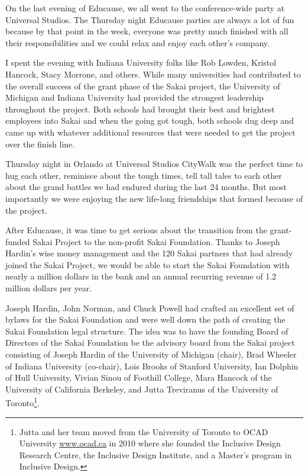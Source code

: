 \documentclass[12pt]{book}
\begin{document}
On the last evening of Educause, we all went to the
conference-wide party at Universal Studios.  The
Thursday night Educause parties are always a lot of fun because
by that point in the week, everyone was
pretty much finished with all their responsibilities
and we could relax and enjoy each other's company.

I spent the evening with
Indiana University
folks like Rob Lowden, Kristol Hancock, Stacy Morrone,
and others.   While many universities had contributed
to the overall success of the grant phase of the Sakai
project, the University of Michigan and Indiana University
had provided the strongest leadership throughout the project.
Both schools had brought their best and brightest employees
into Sakai and when the going got tough, both schools
dug deep and came up with whatever additional resources
that were needed to get the project over the finish line.

Thursday night in Orlando at Universal
Studios CityWalk was the perfect time to
hug each other, reminisce about the tough times,
tell tall tales to each other about the
grand battles we had endured during the last 24 months.
But most importantly we were enjoying the new life-long
friendships that formed because of the project.

After Educause, it was time to get serious
about the transition from the grant-funded Sakai
Project to the non-profit Sakai Foundation.
Thanks to Joseph Hardin's wise money management
and the 120 Sakai partners that had already
joined the Sakai Project, we would be able to start
the Sakai Foundation with nearly a million dollars
in the bank and an annual recurring revenue of
1.2 million dollars per year.

Joseph Hardin, John Norman, and Chuck Powell
had crafted an excellent set of bylaws for the
Sakai Foundation and were well down the
path of creating the Sakai Foundation legal structure.
The idea was to have the founding Board of Directors
of the Sakai Foundation be the advisory board from
the Sakai project consisting of
Joseph Hardin of the University of Michigan (chair),
Brad Wheeler of Indiana University (co-chair),
Lois Brooks of Stanford University,
Ian Dolphin of Hull University,
Vivian Sinou of Foothill College,
Mara Hancock of the University of California Berkeley,
and
Jutta Treviranus of the University of Toronto\footnote{
Jutta and her team moved from the University of
Toronto to OCAD University
\url{www.ocad.ca} in 2010 where she founded
the Inclusive Design Research Centre, the Inclusive Design Institute,
and
a Master's program in Inclusive Design.}.
\end{document}
